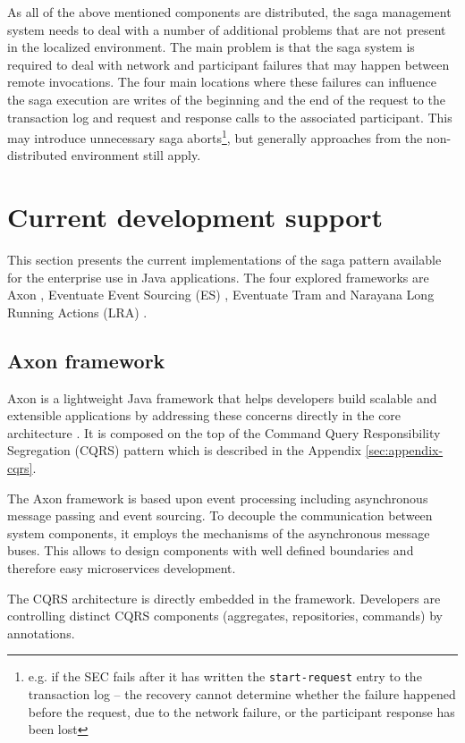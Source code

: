 \documentclass[oneside,
  digital, %
  table,   %
  lof,     %
  lot,     %
]{fithesis3}
\begin{document}
As all of the above mentioned components are distributed, the saga management system needs to deal with a number of additional problems that are not present in the localized environment. The main problem is that the saga system is required to deal with network and participant failures that may happen between remote invocations. The four main locations where these failures can influence the saga execution are writes of the beginning and the end of the request to the transaction log and request and response calls to the associated participant. This may introduce unnecessary saga aborts\footnote{e.g. if the SEC fails after it has written the \texttt{start-request} entry to the transaction log -- the recovery cannot determine whether the failure happened before the request, due to the network failure, or the participant response has been lost}, but generally approaches from the non-distributed environment still apply.

\section{Current development support}

This section presents the current implementations of the saga pattern available for the enterprise use in Java applications. The four explored frameworks are Axon \cite{axon_framework}, Eventuate Event Sourcing (ES) \cite{eventuate.io}, Eventuate Tram \cite{eventuate-tram} and Narayana Long Running Actions (LRA) \cite{narayana_lra}.

\subsection{Axon framework}

Axon is a lightweight Java framework that helps developers build scalable and extensible applications by addressing these concerns directly in the core architecture \cite{axon_framework}. It is composed on the top of the Command Query Responsibility Segregation (CQRS) pattern which is described in the Appendix \ref{sec:appendix-cqrs}.

The Axon framework is based upon event processing including asynchronous message passing and event sourcing. To decouple the communication between system components, it employs the mechanisms of the asynchronous message buses. This allows to design components with well defined boundaries and therefore easy microservices development.

The CQRS architecture is directly embedded in the framework. Developers are controlling distinct CQRS components (aggregates, repositories, commands) by annotations. 
\end{document}
